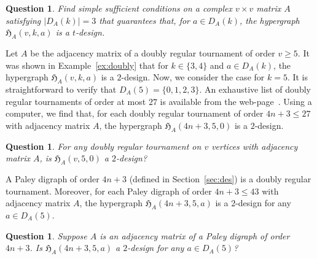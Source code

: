 \documentclass[11pt]{article}
\newtheorem{question}[theorem]{Question}
\begin{document}
\begin{question}
Find simple sufficient conditions on a complex $v \times v$ matrix $A$ satisfying $|D_A(k)| = 3$ that guarantees that, for $a \in D_A(k)$, the hypergraph $\mathfrak H_A(v,k,a)$ is a $t$-design.
\end{question}


Let $A$ be the adjacency matrix of a doubly regular tournament of order $v \geqslant 5$. %
It was shown in Example~\ref{ex:doubly} that for $k\in \{3,4\}$ and $a\in D_A(k)$, the hypergraph $\mathfrak H_A(v,k,a)$ is a $2$-design. 
Now, we consider the case for $k=5$. 
It is straightforward to verify that $D_A(5)=\{0,1,2,3\}$. 
An exhaustive list of doubly regular tournaments of order at most $27$ is available from the web-page~\cite{M}. 
Using a computer, we find that, for each doubly regular tournament of order $4n+3 \leqslant 27$ with adjacency matrix $A$, the hypergraph $\mathfrak H_A(4n+3,5,0)$ is a $2$-design. 

\begin{question}
    For any doubly regular tournament on $v$ vertices with adjacency matrix $A$, is $\mathfrak H_A(v,5,0)$ a $2$-design?
\end{question}

A Paley digraph of order $4n+3$ (defined in Section~\ref{sec:des}) is a doubly regular tournament. 
Moreover, for each Paley digraph of order $4n+3 \leqslant 43$ with adjacency matrix $A$, the hypergraph $\mathfrak H_A(4n+3,5,a)$ is a $2$-design for any $a\in D_A(5)$.  


\begin{question}
Suppose $A$ is an adjacency matrix of a Paley digraph of order $4n+3$.
Is $\mathfrak H_A(4n+3,5,a)$ a $2$-design for any $a\in D_A(5)$?
\end{question}
\end{document}
